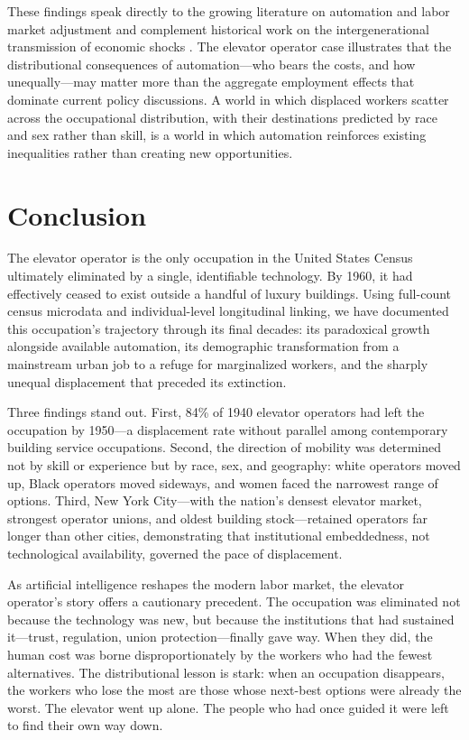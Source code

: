 \documentclass[12pt]{article}
\begin{document}
These findings speak directly to the growing literature on automation and labor market adjustment \citep{dauth2021, webb2020, hicks2023} and complement historical work on the intergenerational transmission of economic shocks \citep{bleakleyferrie2016}. The elevator operator case illustrates that the distributional consequences of automation---who bears the costs, and how unequally---may matter more than the aggregate employment effects that dominate current policy discussions. A world in which displaced workers scatter across the occupational distribution, with their destinations predicted by race and sex rather than skill, is a world in which automation reinforces existing inequalities rather than creating new opportunities.



\section{Conclusion} \label{sec:conclusion}

The elevator operator is the only occupation in the United States Census ultimately eliminated by a single, identifiable technology. By 1960, it had effectively ceased to exist outside a handful of luxury buildings. Using full-count census microdata and individual-level longitudinal linking, we have documented this occupation's trajectory through its final decades: its paradoxical growth alongside available automation, its demographic transformation from a mainstream urban job to a refuge for marginalized workers, and the sharply unequal displacement that preceded its extinction.

Three findings stand out. First, 84\% of 1940 elevator operators had left the occupation by 1950---a displacement rate without parallel among contemporary building service occupations. Second, the direction of mobility was determined not by skill or experience but by race, sex, and geography: white operators moved up, Black operators moved sideways, and women faced the narrowest range of options. Third, New York City---with the nation's densest elevator market, strongest operator unions, and oldest building stock---retained operators far longer than other cities, demonstrating that institutional embeddedness, not technological availability, governed the pace of displacement.

As artificial intelligence reshapes the modern labor market, the elevator operator's story offers a cautionary precedent. The occupation was eliminated not because the technology was new, but because the institutions that had sustained it---trust, regulation, union protection---finally gave way. When they did, the human cost was borne disproportionately by the workers who had the fewest alternatives. The distributional lesson is stark: when an occupation disappears, the workers who lose the most are those whose next-best options were already the worst. The elevator went up alone. The people who had once guided it were left to find their own way down.
\end{document}
